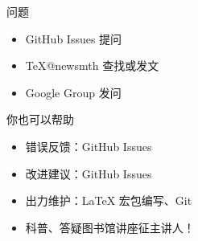 \begin{frame}{\ThuThesis 问题}
	\begin{itemize}
		\item GitHub Issues 提问
		\item \TeX @newsmth 查找或发文
		\item \href{http://groups.google.com/group/thuthesis}\ThuThesis{} Google Group 发问
	\end{itemize}
\end{frame}


\begin{frame}{你也可以帮助}
	\begin{itemize}
		\item 错误反馈：GitHub Issues
		\item 改进建议：GitHub Issues
		\item 出力维护：LaTeX 宏包编写、Git
		\item 科普、答疑\pause \hspace{2em}\alert{图书馆讲座征主讲人！}
	\end{itemize}
\end{frame}


